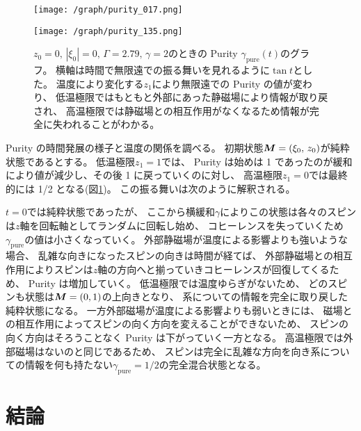 \documentclass[11pt,dvipdfmx,a4paper]{jsarticle}
\begin{document}
\begin{figure}[htb]
	\centering
	\begin{minipage}[t]{0.48\columnwidth}
		\centering
		\texttt{[image: /graph/purity\_017.png]}
	\end{minipage}
	\hfill
	\begin{minipage}[t]{0.48\columnwidth}
		\centering
		\texttt{[image: /graph/purity\_135.png]}
	\end{minipage}
	\caption{\(z_0 = 0,\, |\xi_0|=0,\,\Gamma=2.79,\,\gamma=2\)のときの
	 Purity \(\gamma_{\text{pure}}(t)\)のグラフ。
	 横軸は時間で無限遠での振る舞いを見れるように\(\tan t\)とした。
	 温度により変化する\(z_{1}\)により無限遠での Purity の値が変わり、
	 低温極限ではもともと外部にあった静磁場により情報が取り戻され、
	 高温極限では静磁場との相互作用がなくなるため情報が完全に失われることがわかる。}
	 \label{graph:purity}
\end{figure}

Purity の時間発展の様子と温度の関係を調べる。
初期状態\(\vb*{M}=(\xi_0,\,z_0)\)が純粋状態であるとする。
低温極限\(z_{1}=1\)では、
Purity は始めは 1 であったのが緩和により値が減少し、その後 1 に戻っていくのに対し、
高温極限\(z_{1}=0\)では最終的には 1/2 となる(図\ref{graph:purity})。
この振る舞いは次のように解釈される。

\(t=0\)では純粋状態であったが、
ここから横緩和\(\gamma\)によりこの状態は各々のスピンは\(z\)軸を回転軸としてランダムに回転し始め、
コヒーレンスを失っていくため\(\gamma_{\text{pure}}\)の値は小さくなっていく。
外部静磁場が温度による影響よりも強いような場合、
乱雑な向きになったスピンの向きは時間が経てば、
外部静磁場との相互作用によりスピンは\(z\)軸の方向へと揃っていきコヒーレンスが回復してくるため、
Purity は増加していく。
低温極限では温度ゆらぎがないため、
どのスピンも状態は\(\vb*{M}=(0,1)\)の上向きとなり、
系についての情報を完全に取り戻した純粋状態になる。
一方外部磁場が温度による影響よりも弱いときには、
磁場との相互作用によってスピンの向く方向を変えることができないため、
スピンの向く方向はそろうことなく Purity は下がっていく一方となる。
高温極限では外部磁場はないのと同じであるため、
スピンは完全に乱雑な方向を向き系についての情報を何も持たない\(\gamma_{\text{pure}}=1/2\)の完全混合状態となる。



\section{結論}
\end{document}
